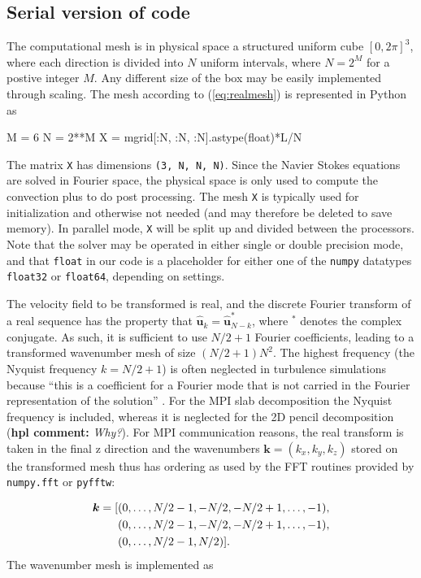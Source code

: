 \documentclass[11pt, oneside]{article}
\newcommand{\inpyth}{\lstinline[style=pythonstyle, basicstyle=\ttfamily]} %[]%
\newcommand{\hpl}[1]{({\bf hpl comment:} \emph{#1})}
\begin{document}
\subsection{Serial version of code}
The computational mesh is in physical space a structured uniform cube $[0, 2\pi]^3$, where each direction is divided into $N$ uniform intervals, where $N=2^M$ for a postive integer $M$. Any different size of the box may be easily implemented through scaling. The mesh according to (\ref{eq:realmesh}) is represented in Python as

\begin{python}
M = 6
N = 2**M
X = mgrid[:N, :N, :N].astype(float)*L/N
\end{python}
The matrix \inpyth{X} has dimensions \inpyth{(3, N, N, N)}. Since the Navier Stokes equations are solved in Fourier space, the physical space is only used to compute the convection plus to do post processing. The mesh \inpyth{X} is typically used for initialization and otherwise not needed (and may therefore be deleted to save memory). In parallel mode, \inpyth{X} will be split up and divided between the processors.  Note that the solver may be operated in either single or double precision mode, and that \inpyth{float} in our code is a placeholder for either one of the \inpyth{numpy} datatypes \inpyth{float32} or \inpyth{float64}, depending on settings.

The velocity field to be transformed is real, and the discrete Fourier transform of a real sequence has the property that $\hat{\bm{u}}_k = \hat{\bm{u}}_{N-k}^*$, where $^*$ denotes the complex conjugate. As such, it is sufficient to use $N/2+1$ Fourier coefficients, leading to a transformed wavenumber mesh of size $(N/2+1)N^2$. The highest frequency (the Nyquist frequency $k=N/2+1$) is often neglected in turbulence simulations because ``this is a coefficient for a Fourier mode that is not carried in the
Fourier representation of the solution'' \cite{Lee2013}. For the MPI slab decomposition the Nyquist frequency is included, whereas it is neglected for the 2D pencil decomposition \hpl{Why?}. For MPI communication reasons, the real transform is taken in the final z direction and the wavenumbers $\bm{k}=(k_x, k_y, k_z)$ stored on the transformed mesh thus has ordering as used by the FFT routines provided by \texttt{numpy.fft} or \texttt{pyfftw}:

\begin{align}
  \bm{k} = [&(0, \ldots, N/2-1, -N/2, -N/2+1, \ldots, -1), \notag \\
   &(0, \ldots, N/2-1, -N/2, -N/2+1, \ldots, -1),  \notag \\
  &(0, \ldots, N/2-1, N/2)].
\end{align}
The wavenumber mesh is implemented as
\end{document}
